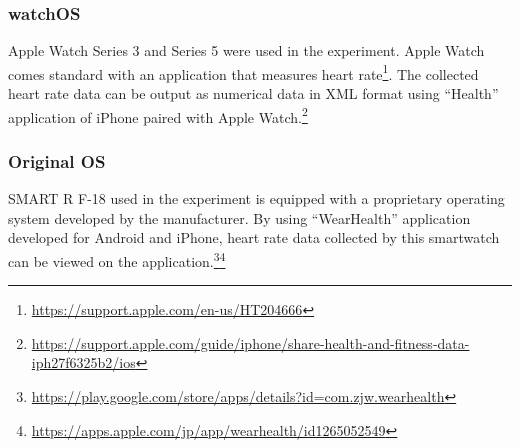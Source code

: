 \documentclass[sigchi,authordraft]{acmart}
\begin{document}



\subsubsection{watchOS}
\label{subsec:applewatch}
Apple Watch Series 3 and Series 5 were used in the experiment. Apple Watch comes standard with an application that measures heart rate\footnote{\url{https://support.apple.com/en-us/HT204666}}. The collected heart rate data can be output as numerical data in XML format using ``Health'' application of iPhone paired with Apple Watch.\footnote{\url{https://support.apple.com/guide/iphone/share-health-and-fitness-data-iph27f6325b2/ios}}


\subsubsection{Original OS}
\label{subsec:original}
SMART R F-18 used in the experiment is equipped with a proprietary operating system developed by the manufacturer. By using ``WearHealth'' application developed for Android and iPhone, heart rate data collected by this smartwatch can be viewed on the application.\footnote{\url{https://play.google.com/store/apps/details?id=com.zjw.wearhealth}}\footnote{\url{https://apps.apple.com/jp/app/wearhealth/id1265052549}}

\end{document}
